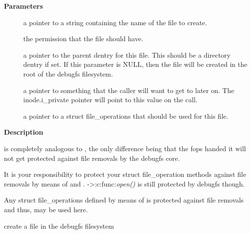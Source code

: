\documentclass[a4paper,8pt,english]{sphinxmanual}
\begin{document}
\textbf{Parameters}
\begin{description}
\item[{}] \leavevmode
a pointer to a string containing the name of the file to create.

\item[{}] \leavevmode
the permission that the file should have.

\item[{}] \leavevmode
a pointer to the parent dentry for this file.  This should be a
directory dentry if set.  If this parameter is NULL, then the
file will be created in the root of the debugfs filesystem.

\item[{}] \leavevmode
a pointer to something that the caller will want to get to later
on.  The inode.i\_private pointer will point to this value on
the  call.

\item[{}] \leavevmode
a pointer to a struct file\_operations that should be used for
this file.

\end{description}

\textbf{Description}

{\hyperref[filesystems/index:c.debugfs_create_file_unsafe]{\emph{}}} is completely analogous to
{\hyperref[filesystems/index:c.debugfs_create_file]{\emph{}}}, the only difference being that the fops
handed it will not get protected against file removals by the
debugfs core.

It is your responsibility to protect your struct file\_operation
methods against file removals by means of 
and . -\textgreater{}:c:func:\emph{open()} is still protected by
debugfs though.

Any struct file\_operations defined by means of
 is protected against file removals and
thus, may be used here.

\begin{fulllineitems}
\label{filesystems/index:c.debugfs_create_file_size}
create a file in the debugfs filesystem

\end{fulllineitems}
\end{document}
